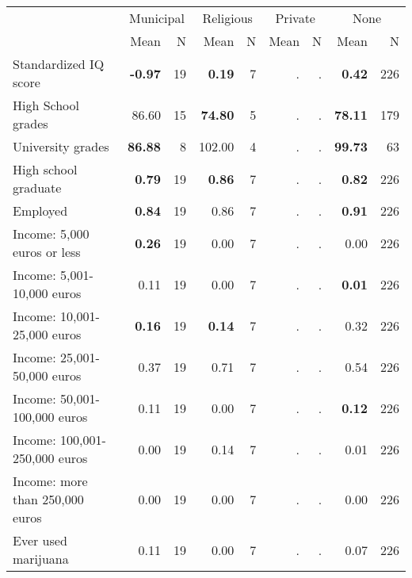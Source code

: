 \begin{tabular}{l r r r r r r r r}
\toprule
& \multicolumn{2}{c}{Municipal} & \multicolumn{2}{c}{Religious} & \multicolumn{2}{c}{Private} & \multicolumn{2}{c}{None} \\
& \scriptsize Mean & \scriptsize N & \scriptsize Mean & \scriptsize N & \scriptsize Mean & \scriptsize N & \scriptsize Mean & \scriptsize N \\
\midrule
Standardized IQ score & \textbf{    -0.97} &        19 & \textbf{     0.19} &         7 &         . & . & \textbf{     0.42} &       226 \\
High School grades &     86.60 &        15 & \textbf{    74.80} &         5 &         . & . & \textbf{    78.11} &       179 \\
University grades & \textbf{    86.88} &         8 &    102.00 &         4 &         . & . & \textbf{    99.73} &        63 \\
High school graduate & \textbf{     0.79} &        19 & \textbf{     0.86} &         7 &         . & . & \textbf{     0.82} &       226 \\
Employed & \textbf{     0.84} &        19 &      0.86 &         7 &         . & . & \textbf{     0.91} &       226 \\
Income: 5,000 euros or less & \textbf{     0.26} &        19 &      0.00 &         7 &         . & . &      0.00 &       226 \\
Income: 5,001-10,000 euros &      0.11 &        19 &      0.00 &         7 &         . & . & \textbf{     0.01} &       226 \\
Income: 10,001-25,000 euros & \textbf{     0.16} &        19 & \textbf{     0.14} &         7 &         . & . &      0.32 &       226 \\
Income: 25,001-50,000 euros &      0.37 &        19 &      0.71 &         7 &         . & . &      0.54 &       226 \\
Income: 50,001-100,000 euros &      0.11 &        19 &      0.00 &         7 &         . & . & \textbf{     0.12} &       226 \\
Income: 100,001-250,000 euros &      0.00 &        19 &      0.14 &         7 &         . & . &      0.01 &       226 \\
Income: more than 250,000 euros &      0.00 &        19 &      0.00 &         7 &         . & . &      0.00 &       226 \\
Ever used marijuana &      0.11 &        19 &      0.00 &         7 &         . & . &      0.07 &       226 \\

\end{tabular}
